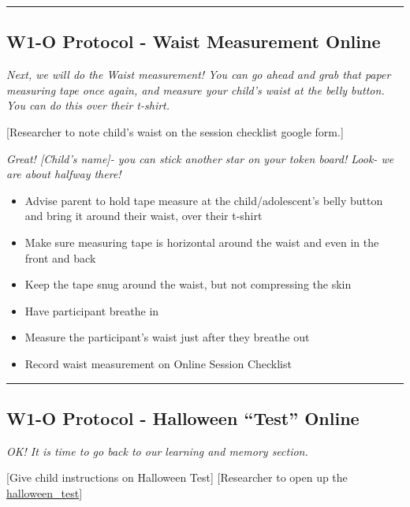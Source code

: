 \documentclass[
]{book}
\providecommand{\tightlist}{%
  \setlength{\itemsep}{0pt}\setlength{\parskip}{0pt}}
\begin{document}
\begin{center}\rule{0.5\linewidth}{0.5pt}\end{center}

\hypertarget{w1-o-protocol---waist-measurement-online}{%
\subsection{W1-O Protocol - Waist Measurement Online}\label{w1-o-protocol---waist-measurement-online}}

\emph{Next, we will do the Waist measurement! You can go ahead and grab that paper measuring tape once again, and measure your child's waist at the belly button. You can do this over their t-shirt.}

{[}Researcher to note child's waist on the session checklist google form.{]}

\emph{Great! {[}Child's name{]}- you can stick another star on your token board! Look- we are about halfway there!}

\begin{itemize}
\tightlist
\item
  Advise parent to hold tape measure at the child/adolescent's belly button and bring it around their waist, over their t-shirt
\item
  Make sure measuring tape is horizontal around the waist and even in the front and back
\item
  Keep the tape snug around the waist, but not compressing the skin
\item
  Have participant breathe in
\item
  Measure the participant's waist just after they breathe out
\item
  Record waist measurement on Online Session Checklist
\end{itemize}

\begin{center}\rule{0.5\linewidth}{0.5pt}\end{center}

\hypertarget{w1-o-protocol---halloween-test-online}{%
\subsection{W1-O Protocol - Halloween ``Test'' Online}\label{w1-o-protocol---halloween-test-online}}

\emph{OK! It is time to go back to our learning and memory section.}

{[}Give child instructions on Halloween Test{]} {[}Researcher to open up the \href{https://ucla.app.box.com/file/709479264913}{halloween\_test}{]}
\end{document}
